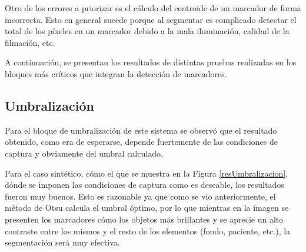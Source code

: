 Otro de los errores a priorizar es el cálculo del centroide de un marcador de forma incorrecta. Esto en general sucede porque al segmentar es complicado detectar el total de los píxeles en un marcador debido a la mala iluminación, calidad de la filmación, etc.

A continuación, se presentan los resultados de distintas pruebas realizadas en los bloques más críticos que integran la detección de marcadores.

\subsection{Umbralización}

Para el bloque de umbralización de este sistema se observó que el resultado obtenido, como era de esperarse, depende fuertemente de las condiciones de captura y obviamente del umbral calculado. 

Para el caso sintético, cómo el que se muestra en la Figura \ref{resUmbralizacion}, dónde se imponen las condiciones de captura como es deseable, los resultados fueron muy buenos. Esto es razonable ya que como se vio anteriormente, el método de Otsu calcula el umbral óptimo, por lo que mientras en la imagen se presenten los marcadores cómo los objetos más brillantes y se aprecie un alto contraste entre los mismos y el resto de los elementos (fondo, paciente, etc.), la segmentación será muy efectiva.

